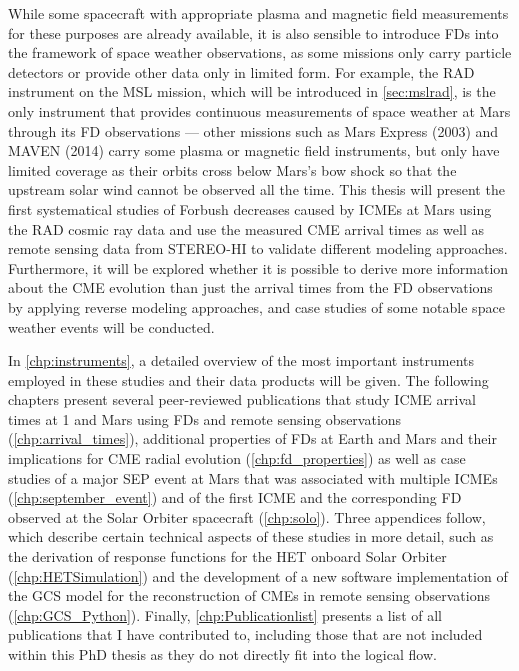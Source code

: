 While some spacecraft with appropriate plasma and magnetic field measurements for these purposes are already available, it is also sensible to introduce \acp{FD} into the framework of space weather observations, as some missions only carry particle detectors or provide other data only in limited form. For example, the \ac{RAD} instrument on the \ac{MSL} mission, which will be introduced in \autoref{sec:mslrad}, is the only instrument that provides continuous measurements of space weather at Mars through its \ac{FD} observations --- other missions such as Mars Express (2003) and MAVEN (2014) carry some plasma or magnetic field instruments, but only have limited coverage as their orbits cross below Mars's bow shock so that the upstream solar wind cannot be observed all the time. This thesis will present the first systematical studies of Forbush decreases caused by \acp{ICME} at Mars using the \ac{RAD} cosmic ray data and use the measured \ac{CME} arrival times as well as remote sensing data from \ac{STEREO}-\ac{HI} to validate different modeling approaches. Furthermore, it will be explored whether it is possible to derive more information about the \ac{CME} evolution than just the arrival times from the \ac{FD} observations by applying reverse modeling approaches, and case studies of some notable space weather events will be conducted.

In \autoref{chp:instruments}, a detailed overview of the most important instruments employed in these studies and their data products will be given. The following chapters present several peer-reviewed publications that study \ac{ICME} arrival times at \SI{1}{\AU} and Mars using \acp{FD} and remote sensing observations (\autoref{chp:arrival_times}), additional properties of \acp{FD} at Earth and Mars and their implications for \ac{CME} radial evolution (\autoref{chp:fd_properties}) as well as case studies of a major \ac{SEP} event at Mars that was associated with multiple \acp{ICME} (\autoref{chp:september_event}) and of the first \ac{ICME} and the corresponding \ac{FD} observed at the Solar Orbiter spacecraft (\autoref{chp:solo}). Three appendices follow, which describe certain technical aspects of these studies in more detail, such as the derivation of response functions for the \ac{HET} onboard Solar Orbiter (\autoref{chp:HETSimulation}) and the development of a new software implementation of the \ac{GCS} model for the reconstruction of \acp{CME} in remote sensing observations (\autoref{chp:GCS_Python}). Finally, \autoref{chp:Publicationlist} presents a list of all publications that I have contributed to, including those that are not included within this PhD thesis as they do not directly fit into the logical flow.
